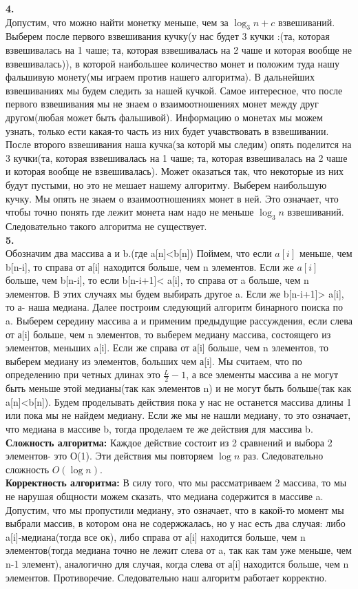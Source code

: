 \documentclass[a4paper,12pt]{article}
\begin{document}
\textbf{4.}\\
Допустим, что можно найти монетку меньше, чем за $\log_3 n + c$ взвешиваний. Выберем после первого взвешивания кучку(у нас будет 3 кучки :(та, которая взвешивалась на 1 чаше; та, которая взвешивалась на 2 чаше и которая вообще не взвешивалась)), в которой наибольшее количество монет и положим туда нашу фальшивую монету(мы играем против нашего алгоритма). В дальнейших взвешиваниях мы будем следить за нашей кучкой. Самое интересное, что после первого взвешивания мы не знаем о взаимоотношениях монет между друг другом(любая может быть фальшивой). Информацию о монетах мы можем узнать, только ести какая-то часть из них будет учавствовать в взвешивании. После второго взвешивания наша кучка(за которй мы следим) опять поделится на 3 кучки(та, которая взвешивалась на 1 чаше; та, которая взвешивалась на 2 чаше и которая вообще не взвешивалась). Может оказаться так, что некоторые из них будут пустыми, но это не мешает нашему алгоритму. Выберем наибольшую кучку. Мы опять не знаем о взаимоотношениях монет в ней. Это означает, что чтобы точно понять где лежит монета нам надо не меньше $\log_3 n$ взвешиваний. Следовательно такого алгоритма не существует.\\
\textbf{5.}\\
Обозначим два массива а и b.(где a[n]<b[n]) Поймем, что если $a[i]$ меньше, чем b[n-i], то справа от а[i] находится больше, чем n элементов. Если же $a[i]$ больше, чем b[n-i], то если b[n-i+1]< a[i], то справа от a больше, чем   n элементов. В этих случаях мы будем выбирать другое a. Если же b[n-i+1]> a[i], то а- наша медиана. Далее построим следующий алгоритм бинарного поиска по a. Выберем середину массива а и применим предыдущие рассуждения, если слева от а[i] больше, чем n элементов, то выберем медиану массива, состоящего из элементов, меньших a[i]. Если же справа от а[i] больше, чем n элементов, то выберем медиану из элементов, больших чем а[i]. Мы считаем, что по определению при четных длинах это $\frac{L}{2}-1$, а все элементы массива а не могут быть меньше этой медианы(так как элементов n) и не могут быть больше(так как a[n]<b[n]). Будем проделывать действия пока у нас не останется массива длины 1 или пока мы не найдем медиану. Если же мы не нашли медиану, то это означает, что медиана в массиве b, тогда проделаем те же действия для массива b.\\

\textbf{Сложность алгоритма:} Каждое действие состоит из 2 сравнений и выбора 2 элементов- это О(1). Эти действия мы повторяем $\log n$ раз. Следовательно сложность $O(\log n)$.\\
\textbf{Корректность алгоритма:} В силу того, что мы рассматриваем 2 массива, то мы не нарушая общности можем сказать, что медиана содержится в массиве a. Допустим, что мы пропустили медиану, это означает, что в какой-то момент мы выбрали массив, в котором она не содержжалась, но у нас есть два случая: либо a[i]-медиана(тогда все ок), либо справа от а[i] находится больше, чем n элементов(тогда медиана точно не лежит слева от a, так как там уже меньше, чем n-1 элемент), аналогично для случая, когда слева от а[i] находится больше, чем n элементов. Противоречие. Следовательно наш алгоритм работает корректно.\\
\end{document}
